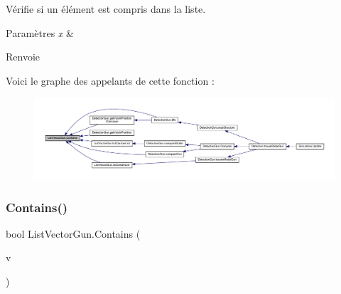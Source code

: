 Vérifie si un élément est compris dans la liste. 


\begin{DoxyParams}{Paramètres}
{\em x} & \\
\hline
\end{DoxyParams}
\begin{DoxyReturn}{Renvoie}

\end{DoxyReturn}
Voici le graphe des appelants de cette fonction \+:
\nopagebreak
\begin{figure}[H]
\begin{center}
\leavevmode
\includegraphics[width=350pt]{class_list_vector_gun_afacf0a838223ed57e72abcc7c21594ae_icgraph}
\end{center}
\end{figure}
\mbox{\label{class_list_vector_gun_a6cff6d5a51a605010ca4ced8ef89e8c2}} 
\subsubsection{\texorpdfstring{Contains()}{Contains()}\hspace{0.1cm}{\footnotesize\ttfamily [2/2]}}
{\footnotesize\ttfamily bool List\+Vector\+Gun.\+Contains (\begin{DoxyParamCaption}\item[{\mbox{\hyperlink{class_list_vector_gun}{List\+Vector\+Gun}}}]{v }\end{DoxyParamCaption})\hspace{0.3cm}{\ttfamily [inline]}}






